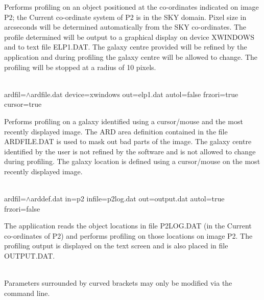 \documentclass[twoside,11pt]{article}
\newcommand{\LineBreak}{\hfill\break\hbox{}\qquad}
\newlength{\sstexampleslength}
\newcommand{\sstexamplesubsection}[2]{\sloppy
\item[\parbox{\sstexampleslength}{\ssttt #1}] \mbox{} \vspace{1.0ex}
\\ #2 }
\newcommand{\sstnotes}[1]{\item[Notes:] \mbox{} \\[1.3ex] #1}
\newcommand{\sstexamplesubsection}[2]{\item[{\ssttt #1}] #2}
\newcommand{\sstnotes}[1]{\item[Notes:] #1 }
\begin{document}
{{{         Performs profiling on an object positioned at the co-ordinates
         indicated on image P2; the Current co-ordinate system of P2 is
         in the SKY domain.  Pixel size in arcseconds will be determined
         automatically from the SKY co-ordinates.  The profile
         determined will  be output to a graphical display on device
         XWINDOWS and to text file ELP1.DAT. The galaxy centre
         provided will be refined by the application and during
         profiling the galaxy centre will be allowed to change. The
         profiling will be stopped at a radius of 10 pixels.
      }
      \sstexamplesubsection{
         ellpro mode=true back=6200 sigma=390 psize=1. zerop=27.5
      }{
              ardfil=$\wedge$ardfile.dat device=xwindows out=elp1.dat
\LineBreak
              autol=false frzori=true cursor=true

         Performs profiling on a galaxy identified using a cursor/mouse
         and the most recently displayed image. The ARD area definition
         contained in the file ARDFILE.DAT is used to mask out bad
         parts of the image. The galaxy centre identified by the user
         is not refined by the software and is not allowed to change
         during profiling. The galaxy location is defined using a
         cursor/mouse on the most recently displayed image.
      }
      \sstexamplesubsection{
         ellpro mode=false back=760 sigma=12 psize=0.44 zerop=27.5
      }{
              ardfil=$\wedge$arddef.dat in=p2 infile=p2log.dat
\LineBreak
              out=output.dat autol=true frzori=false

         The appliication reads the object locations in file P2LOG.DAT
         (in the Current co-ordinates of P2) and performs profiling on
         those locations on image P2. The profiling output is displayed
         on the text screen and is also placed in file OUTPUT.DAT.
      }
   }
   \sstnotes{
      Parameters surrounded by curved brackets may only be
      modified via the command line.
   }
}
\newpage
\end{document}

